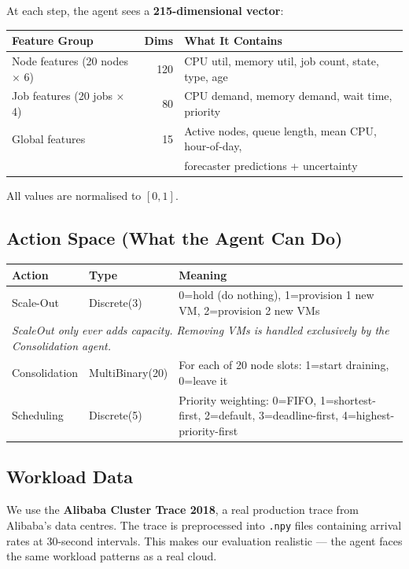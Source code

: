 \documentclass[11pt,a4paper]{article}
\begin{document}
At each step, the agent sees a \textbf{215-dimensional vector}:

\begin{center}
\begin{tabular}{lrl}
\toprule
\textbf{Feature Group} & \textbf{Dims} & \textbf{What It Contains} \\
\midrule
Node features (20 nodes $\times$ 6) & 120 &
  CPU util, memory util, job count, state, type, age \\
Job features (20 jobs $\times$ 4) & 80 &
  CPU demand, memory demand, wait time, priority \\
Global features & 15 &
  Active nodes, queue length, mean CPU, hour-of-day, \\
  & & forecaster predictions + uncertainty \\
\bottomrule
\end{tabular}
\end{center}

All values are normalised to $[0, 1]$.

\subsection{Action Space (What the Agent Can Do)}

\begin{center}
\begin{tabular}{llp{7cm}}
\toprule
\textbf{Action} & \textbf{Type} & \textbf{Meaning} \\
\midrule
Scale-Out & Discrete(3) & 0=hold (do nothing), 1=provision 1 new VM, 2=provision 2 new VMs \\
\multicolumn{3}{l}{\footnotesize\textit{ScaleOut only ever adds capacity. Removing VMs is handled exclusively by the Consolidation agent.}} \\
Consolidation & MultiBinary(20) & For each of 20 node slots: 1=start draining, 0=leave it \\
Scheduling & Discrete(5) & Priority weighting: 0=FIFO, 1=shortest-first, 2=default, 3=deadline-first, 4=highest-priority-first \\
\bottomrule
\end{tabular}
\end{center}

\subsection{Workload Data}

We use the \textbf{Alibaba Cluster Trace 2018}, a real production trace from
Alibaba's data centres. The trace is preprocessed into \texttt{.npy} files
containing arrival rates at 30-second intervals. This makes our evaluation
realistic --- the agent faces the same workload patterns as a real cloud.
\end{document}
